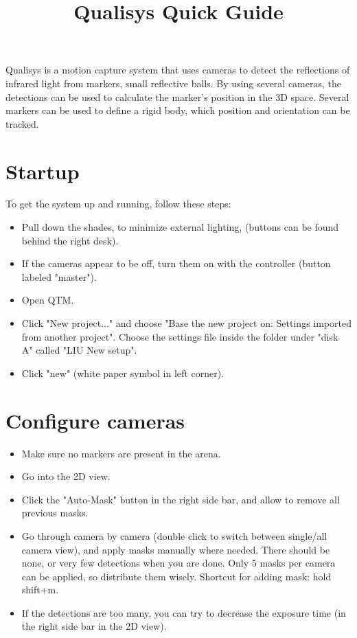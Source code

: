 \documentclass{article}
\title{Qualisys Quick Guide}
\begin{document}
\maketitle

Qualisys is a motion capture system that uses cameras to detect the reflections of infrared light from markers, small reflective balls. By using several cameras, the detections can be used to calculate the marker's position in the 3D space. Several markers can be used to define a rigid body, which position and orientation can be tracked.

\section{Startup}
\label{startup}
To get the system up and running, follow these steps:

\begin{itemize}
    \item Pull down the shades, to minimize external lighting, (buttons can be found behind the right desk).
    \item If the cameras appear to be off, turn them on with the controller (button labeled "master").
    \item Open QTM.
    \item Click "New project..." and choose "Base the new project on: Settings imported from another project". Choose the settings file inside the folder under "disk A" called "LIU New setup".
    \item Click "new" (white paper symbol in left corner).
\end{itemize}

\section{Configure cameras}
\begin{itemize}
    \item Make sure no markers are present in the arena.
    \item Go into the 2D view.
    \item Click the "Auto-Mask" button in the right side bar, and allow to remove all previous masks. 
    \item Go through camera by camera (double click to switch between single/all camera view), and apply masks manually where needed. There should be none, or very few detections when you are done. Only 5 masks per camera can be applied, so distribute them wisely. Shortcut for adding mask: hold shift+m.
    \item If the detections are too many, you can try to decrease the exposure time (in the right side bar in the 2D view).
\end{itemize}
\end{document}
